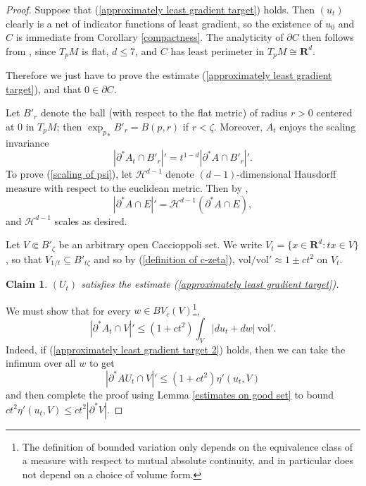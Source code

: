 \documentclass[reqno,12pt,letterpaper]{amsart}
\newcommand{\RR}{\mathbf{R}}
\newcommand{\vol}{\mathrm{vol}}
\newtheorem{claim}[theorem]{Claim}
\theoremstyle{definition}
\numberwithin{equation}{section}
\begin{document}
\begin{proof}
Suppose that (\ref{approximately least gradient target}) holds.
Then $(u_t)$ clearly is a net of indicator functions of least gradient, so the existence of $u_0$ and $C$ is immediate from Corollary \ref{compactness}.
The analyticity of $\partial C$ then follows from \cite[Corollary 9.5]{Giusti77}, since $T_pM$ is flat, $d \leq 7$, and $C$ has least perimeter in $T_pM \cong \RR^d$.

Therefore we just have to prove the estimate (\ref{approximately least gradient target}), and that $0 \in \partial C$.

Let $B'_r$ denote the ball (with respect to the flat metric) of radius $r > 0$ centered at $0$ in $T_pM$; then ${\exp_p}_* B'_r = B(p, r)$ if $r < \zeta$.
Moreover, $A_t$ enjoys the scaling invariance
\begin{equation}\label{scaling of psi}
|\partial^* A_t \cap B'_r|' = t^{1 - d} |\partial^* A \cap B'_r|'.
\end{equation}
To prove (\ref{scaling of psi}), let $\mathscr H^{d - 1}$ denote $(d-1)$-dimensional Hausdorff measure with respect to the euclidean metric.
Then by \cite[Theorem 4.4]{Giusti77},
$$|\partial^* A \cap E|' = \mathscr H^{d - 1}(\partial^* A \cap E),$$
and $\mathscr H^{d - 1}$ scales as desired.

Let $V \Subset B'_\zeta$ be an arbitrary open Caccioppoli set.
We write $V_t = \{x \in \RR^d: tx \in V\}$, so that $V_{1/t} \subseteq B'_{t\zeta}$ and so by (\ref{definition of c-zeta}), $\vol/\vol' \approx 1 \pm ct^2$ on $V_t$.

\begin{claim}\label{blowup claim 1}
$(U_t)$ satisfies the estimate (\ref{approximately least gradient target}).
\end{claim}

We must show that for every $w \in BV_c(V)$\footnote{The definition of bounded variation only depends on the equivalence class of a measure with respect to mutual absolute continuity, and in particular does not depend on a choice of volume form.},
\begin{equation}\label{approximately least gradient target 2}
|\partial^* A_t \cap V|' \leq (1 + ct^2) \int_V |du_t + dw| ~\vol'.
\end{equation}
Indeed, if (\ref{approximately least gradient target 2}) holds, then we can take the infimum over all $w$ to get
$$|\partial^*AU_t \cap V|' \leq (1 + ct^2) \eta'(u_t, V)$$
and then complete the proof using Lemma \ref{estimates on good set} to bound $ct^2 \eta'(u_t, V) \leq ct^2 |\partial^* V|$.


\end{proof}
\end{document}
